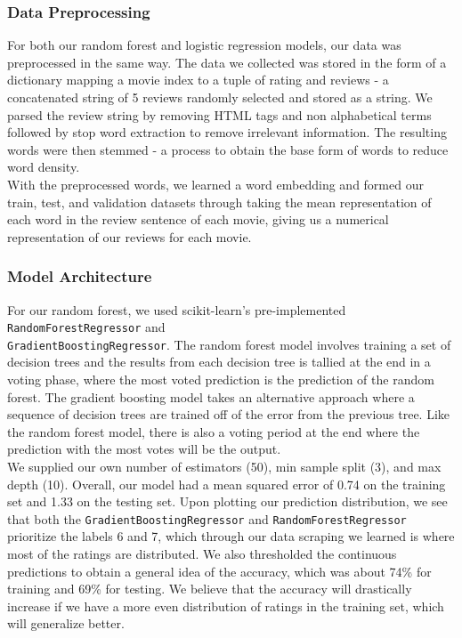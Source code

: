 \documentclass[11pt]{article}
\newcommand{\np}{\newpage}
\begin{document}
\subsubsection{Data Preprocessing}\label{data_processing}
For both our random forest and logistic regression models, our data was preprocessed in the same way.  The data we collected was stored in the form of a dictionary mapping a movie index to a tuple of rating and reviews - a concatenated string of 5 reviews randomly selected and stored as a string.  We parsed the review string by removing HTML tags and non alphabetical terms followed by stop word extraction to remove irrelevant information.  The resulting words were then stemmed - a process to obtain the base form of words to reduce word density.
\\[2mm]
With the preprocessed words, we learned a word embedding and formed our train, test, and validation datasets through taking the mean representation of each word in the review sentence of each movie, giving us a numerical representation of our reviews for each movie.

\subsubsection{Model Architecture}
For our random forest, we used scikit-learn's pre-implemented \texttt{RandomForestRegressor} and\\\texttt{GradientBoostingRegressor}.  The random forest model involves training a set of decision trees and the results from each decision tree is tallied at the end in a voting phase, where the most voted prediction is the prediction of the random forest.  The gradient boosting model takes an alternative approach where a sequence of decision trees are trained off of the error from the previous tree.  Like the random forest model, there is also a voting period at the end where the prediction with the most votes will be the output.
\\[2mm]
We supplied our own number of estimators (50), min sample split (3), and max depth (10).  Overall, our model had a mean squared error of 0.74 on the training set and 1.33 on the testing set.  Upon plotting our prediction distribution, we see that both the \texttt{GradientBoostingRegressor} and \texttt{RandomForestRegressor} prioritize the labels 6 and 7, which through our data scraping we learned is where most of the ratings are distributed.  We also thresholded the continuous predictions to obtain a general idea of the accuracy, which was about 74\% for training and 69\% for testing.  We believe that the accuracy will drastically increase if we have a more even distribution of ratings in the training set, which will generalize better.
\np
\end{document}
